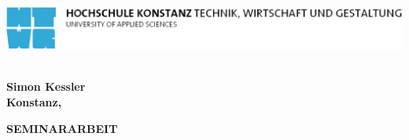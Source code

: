 \begin{titlepage}

\vspace*{-3.5cm}

\begin{flushleft}
\hspace*{-1cm} \includegraphics[width=15.7cm]{htwg-logo}
\end{flushleft}

\vspace{2.5cm}

\begin{center}
	\huge{
		\textbf{\sf \thema} \\[5cm]
	}
	\Large{
		\textbf{\sf Simon Kessler}} \\[6.5cm]
	\large{
		\textbf{\sf Konstanz, \abgabedatum} \\[2.3cm]
	}
	
	\Huge{
		\textbf{{\sf SEMINARARBEIT}}
	}
\end{center}

\end{titlepage}